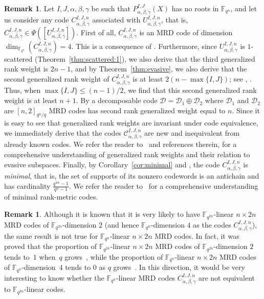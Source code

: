 \documentclass[11pt]{article}
\theoremstyle{definition}
\newtheorem{rema}[theo]{Remark}
\numberwithin{equation}{section}
\begin{document}
\begin{rema}\label{rem:genweights} 
Let $I,J,\alpha,\beta,\gamma$ be such that  $P^{I,J}_{\alpha,\beta,\gamma}(X)$ has no roots in $\mathbb{F}_{q^n}$, and let us consider any code $C_{\alpha, \beta, \gamma}^{I,J,n}$ associated with $U_{\alpha, \beta, \gamma}^{I,J,n}$, that is, $C_{\alpha, \beta, \gamma}^{I,J,n}\in\Psi([U_{\alpha, \beta, \gamma}^{I,J,n}])$. First of all, $C_{\alpha, \beta, \gamma}^{I,J,n}$ is an MRD code of dimension $\dim_{{\mathbb F}_{q^n}}(C_{\alpha, \beta, \gamma}^{I,J,n})=4$. This is a consequence of \cite[Theorem 3.2]{csajbok2017maximum}. 
Furthermore, since $U_{\alpha, \beta, \gamma}^{I,J,n}$ is $1$-scattered (Theorem~\ref{thm:scattered:1}), we also derive that the third generalized rank weight is $2n-1$, and by Theorem~\ref{thm:evasive}, we also derive that the second generalized rank weight of $C_{\alpha, \beta, \gamma}^{I,J,n}$ is at least
$2(n-\max\{I,J\})$; see \cite[Theorem 3]{randrianarisoa2020geometric}, \cite[Theorem 3.3]{marino2022evasive}. Thus, when $\max\{I,J\}\leq (n-1)/2$, we find that this second generalized rank weight is at least $n+1$.  By \cite[Proposition 4.10]{BMN2022} a decomposable code $\mathcal{D}=\mathcal{D}_1\oplus \mathcal{D}_2$ where $\mathcal{D}_1$  and $\mathcal{D}_2$ are $[n,2]_{q^n/q}$ MRD codes has second rank generalized weight equal to $n$. Since it is easy to see that generalized rank weights are invariant under code equivalence, we immediately derive that the codes $\mathcal{C}_{\alpha, \beta, \gamma}^{I,J,n}$ are new and inequivalent from already known codes. { We refer the reader to~\cite{marino2022evasive} and references therein, for a comprehensive understanding of generalized rank weights and their relation to evasive subspaces.}
Finally, by Corollary~\ref{cor:minimal} and \cite[Corollary 5.7]{ABNR22}, the code $C_{\alpha, \beta, \gamma}^{I,J,n}$ is \emph{minimal}, that is, the set of supports of its nonzero codewords is an antichain and has cardinality $\frac{q^{4n}-1}{q^n-1}$. We refer the reader to~\cite{ABNR22} for a comprehensive understanding of minimal rank-metric codes.
\end{rema}

\begin{rema}
    {
    Although it is known that it is very likely to have $\mathbb F_{q^{2n}}$-linear $n \times 2n$ MRD codes of $\mathbb F_{q^{2n}}$-dimension $2$ (and hence $\mathbb F_{q^{n}}$-dimension $4$ as the codes $C^{I,J,n}_{\alpha,\beta,\gamma}$), the same result is not true for $\mathbb F_{q^n}$-linear $n \times 2n$ MRD codes. In fact, it was proved that the proportion of $\mathbb F_{q^{2n}}$-linear $n \times 2n$  MRD codes of $\mathbb F_{q^{2n}}$-dimension $2$ tends to~$1$ when~$q$ grows~\cite{neri2018genericity}, while the proportion of $\mathbb F_{q^n}$-linear $n \times 2n$ MRD codes of $\mathbb F_{q^{n}}$-dimension~$4$ tends to $0$ as $q$ grows~\cite{gruica2024densities}. 
    In this direction, it would be very interesting to know whether the $\mathbb F_{q^n}$-linear MRD  codes $C^{I,J,n}_{\alpha,\beta,\gamma}$ are not equivalent to  $\mathbb F_{q^{2n}}$-linear codes.    }
\end{rema}
\end{document}

